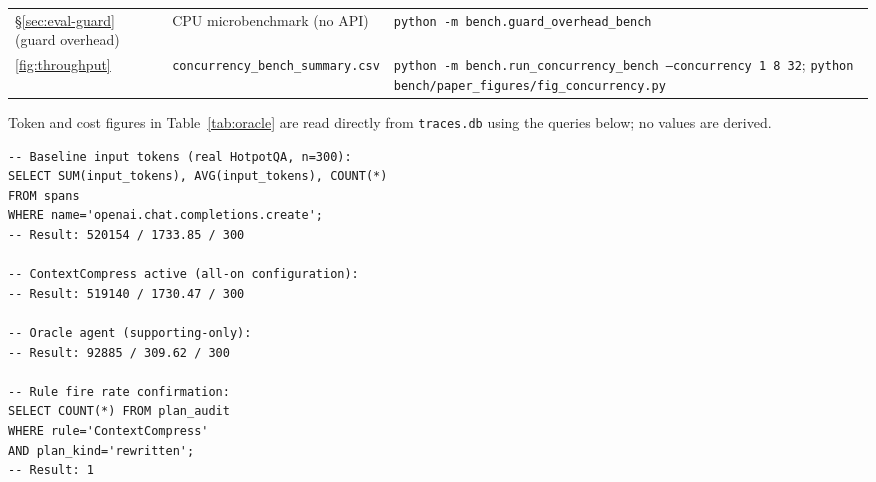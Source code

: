 \documentclass[sigconf,9pt]{acmart}
\begin{document}
\begin{table}[h]
\begin{tabularx}{\linewidth}{p{0.5cm} >{\raggedright\arraybackslash}X >{\raggedright\arraybackslash}X}
\addlinespace
\S\ref{sec:eval-guard} (guard overhead) &
CPU microbenchmark (no API) &
\texttt{python -m bench.guard\_\allowbreak overhead\_\allowbreak bench} \\

\addlinespace
\ref{fig:throughput} &
\texttt{concurrency\_\allowbreak bench\_\allowbreak summary.csv} &
\texttt{python -m bench.run\_\allowbreak concurrency\_\allowbreak bench --concurrency 1 8 32};
\texttt{python bench/paper\_\allowbreak figures/fig\_\allowbreak concurrency.py} \\

\bottomrule
\end{tabularx}
\end{table}

Token and cost figures in Table~\ref{tab:oracle} are read directly from
\texttt{traces.db} using the queries below; no values are derived.

\begin{verbatim}
-- Baseline input tokens (real HotpotQA, n=300):
SELECT SUM(input_tokens), AVG(input_tokens), COUNT(*)
FROM spans
WHERE name='openai.chat.completions.create';
-- Result: 520154 / 1733.85 / 300

-- ContextCompress active (all-on configuration):
-- Result: 519140 / 1730.47 / 300

-- Oracle agent (supporting-only):
-- Result: 92885 / 309.62 / 300

-- Rule fire rate confirmation:
SELECT COUNT(*) FROM plan_audit
WHERE rule='ContextCompress'
AND plan_kind='rewritten';
-- Result: 1
\end{verbatim}



\end{document}

